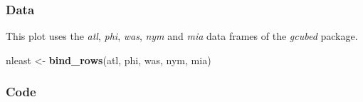 \documentclass[]{book}
\newenvironment{Shaded}{\begin{snugshade}}{\end{snugshade}}
\newcommand{\KeywordTok}[1]{\textcolor[rgb]{0.13,0.29,0.53}{\textbf{#1}}}
\newcommand{\NormalTok}[1]{#1}
\newcommand{\StringTok}[1]{\textcolor[rgb]{0.31,0.60,0.02}{#1}}
\begin{document}
\hypertarget{nleastbarsdata}{%
\subsubsection*{Data}\label{nleastbarsdata}}

This plot uses the \emph{atl}, \emph{phi}, \emph{was}, \emph{nym} and \emph{mia} data frames of the \emph{gcubed} package.

\begin{Shaded}
\begin{Highlighting}[]
\NormalTok{nleast <-}\StringTok{ }\KeywordTok{bind_rows}\NormalTok{(atl, phi, was, nym, mia)}
\end{Highlighting}
\end{Shaded}

\hypertarget{nleastbarscode}{%
\subsubsection*{Code}\label{nleastbarscode}}
\end{document}
